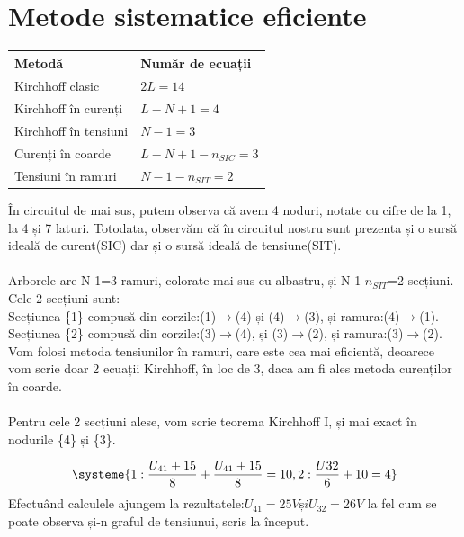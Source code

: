 \documentclass[12pt,twoside]{article}
\begin{document}
\section{Metode sistematice eficiente}
\begin{center}
\begin{tabular}{|m{10cm}|m{5cm}|}
\hline
Metodă & Număr de ecuații\\
\hline\hline
Kirchhoff clasic & $2L = 14$\\
\hline
Kirchhoff în curenți & $L - N + 1 = 4$\\
\hline
Kirchhoff în tensiuni & $N - 1 = 3$\\
\hline
Curenți în coarde & $L - N + 1 - n_{SIC} = 3$\\
\hline
Tensiuni în ramuri & $N - 1 - n_{SIT} = 2$\\
\hline
\end{tabular}
\end{center}
În circuitul de mai sus, putem observa că avem 4 noduri, notate cu cifre de la 1, la 4 și 7 laturi. Totodata, observăm că în circuitul nostru sunt prezenta și o sursă ideală de curent(SIC) dar și o sursă ideală de tensiune(SIT).\\\\
Arborele are N-1=3 ramuri, colorate mai sus cu albastru, și N-1-$n_{SIT}$=2 secțiuni.
Cele 2 secțiuni sunt:\\
Secțiunea \{1\} compusă din corzile:(1)$\rightarrow$(4) și (4)$\rightarrow$(3), și ramura:(4)$\rightarrow$(1).\\
Secțiunea \{2\} compusă din corzile:(3)$\rightarrow$(4), și (3)$\rightarrow$(2), și ramura:(3)$\rightarrow$(2).
\newpage
Vom folosi metoda tensiunilor în ramuri, care este cea mai eficientă, deoarece vom scrie doar 2 ecuații Kirchhoff, în loc de 3, daca am fi ales metoda curenților în coarde.
\\\\
Pentru cele 2 secțiuni alese, vom scrie teorema Kirchhoff I, și mai exact în nodurile
\{4\} și \{3\}.

\begin{equation}
\systeme{{1}:\frac{U_{41}+15}{8}+\frac{U_{41}+15}{8}=10 ,
{2}:\frac{U{32}}{6}+10=4}
\end{equation}
Efectuând calculele ajungem la rezultatele:$U_{41}=25V și U_{32}=26V$ la fel cum se poate observa și-n graful de tensiunui, scris la început.

\newpage
\end{document}
